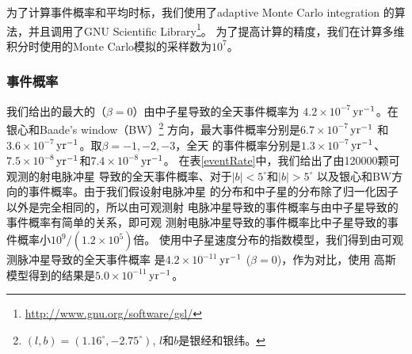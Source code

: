 为了计算事件概率和平均时标，我们使用了adaptive Monte Carlo integration
的算法，并且调用了GNU Scientific Library\footnote{\url{http://www.gnu.org/software/gsl/}}。
为了提高计算的精度，我们在计算多维积分时使用的Monte Carlo模拟的采样数为$10^7$。

\subsubsection{事件概率}

我们给出的最大的（$\beta = 0$）由中子星导致的全天事件概率为
$4.2\times10^{-7}$\,$\rm{yr^{-1}}$。在银心和Baade's window（BW）\footnote{$(l,b)=(1.16^{\circ},-2.75^{\circ})$, $l$和$b$是银经和银纬。} 
方向，最大事件概率分别是$6.7\times10^{-7}$\,$\rm{yr^{-1}}$
和$3.6\times10^{-7}$\,$\rm{yr^{-1}}$。取$\beta=-1,-2,-3$，全天
的事件概率分别是$1.3\times10^{-7}$\,$\rm{yr^{-1}}$、
$7.5\times10^{-8}$\,$\rm{yr^{-1}}$和$7.4\times10^{-8}$\,$\rm{yr^{-1}}$。
在表\ref{eventRate}中，我们给出了由120000颗可观测的射电脉冲星
导致的全天事件概率、对于$\mid b\mid<5^{\circ}$和$\mid
b\mid>5^{\circ}$ 以及银心和BW方向的事件概率。由于我们假设射电脉冲星
的分布和中子星的分布除了归一化因子以外是完全相同的，所以由可观测射
电脉冲星导致的事件概率与由中子星导致的事件概率有简单的关系，即可观
测射电脉冲星导致的事件概率比中子星导致的事件概率小$10^9/\left(1.2\times10^5\right)$倍。
使用中子星速度分布的指数模型，我们得到由可观测脉冲星导致的全天事件概率
是$4.2\times10^{-11}$\,$\rm{yr^{-1}}$ ($\beta=0$)，作为对比，使用
高斯模型得到的结果是$5.0\times10^{-11}$\,$\rm{yr^{-1}}$。

